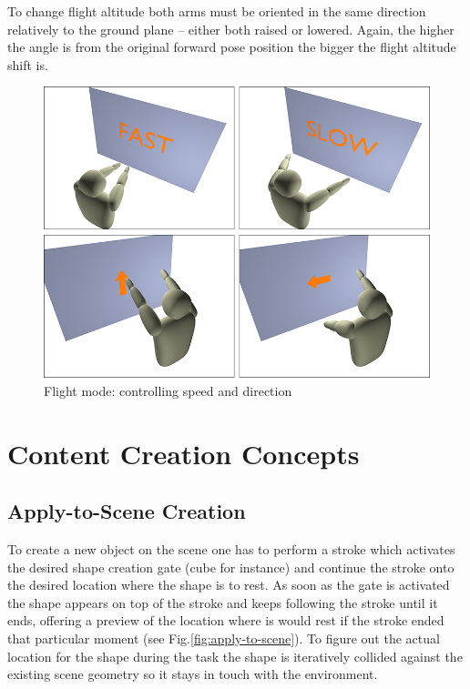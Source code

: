 To change flight altitude both arms must be oriented in the same direction relatively to the ground plane
-- either both raised or lowered. Again, the higher the angle is from the original forward pose position
the bigger the flight altitude shift is.

\begin{figure}[ht]
	\centering
		\includegraphics[scale=0.3]{gfx/flight.png}
	\caption{Flight mode: controlling speed and direction}
	\label{fig:flight}
\end{figure}



\section{Content Creation Concepts}

\subsection{Apply-to-Scene Creation}
\label{design:apply-to-scene}

To create a new object on the scene one has to perform a stroke which activates the desired shape creation gate (cube for instance)
and continue the stroke onto the desired location where the shape is to rest. As soon as the gate is activated the shape appears
on top of the stroke and keeps following the stroke until it ends, offering a preview of the location where is would rest
if the stroke ended that particular moment (see Fig.\ref{fig:apply-to-scene}).
To figure out the actual location for the shape during the task the shape is iteratively collided against the
existing scene geometry so it stays in touch with the environment.

